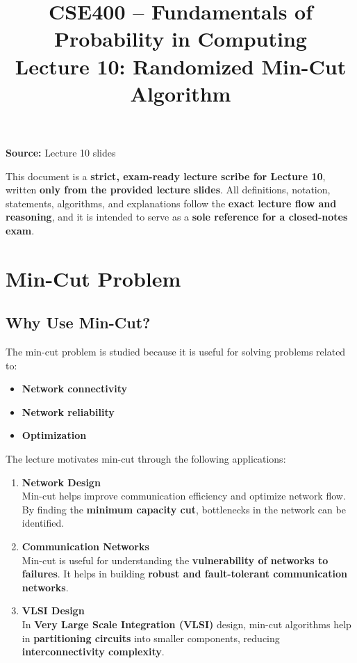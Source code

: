 \documentclass[11pt]{article}
\title{\textbf{CSE400 -- Fundamentals of Probability in Computing} \\[0.5em]
\large Lecture 10: Randomized Min-Cut Algorithm}
\author{}
\date{}
\begin{document}
\maketitle

\vspace{-1em}

\noindent
\textbf{Source:} Lecture 10 slides

\bigskip

\noindent
This document is a \textbf{strict, exam-ready lecture scribe for Lecture 10}, written \textbf{only from the provided lecture slides}.  
All definitions, notation, statements, algorithms, and explanations follow the \textbf{exact lecture flow and reasoning}, and it is intended to serve as a \textbf{sole reference for a closed-notes exam}.


\section{Min-Cut Problem}

\subsection{Why Use Min-Cut?}

The min-cut problem is studied because it is useful for solving problems related to:

\begin{itemize}
    \item \textbf{Network connectivity}
    \item \textbf{Network reliability}
    \item \textbf{Optimization}
\end{itemize}

The lecture motivates min-cut through the following applications:

\begin{enumerate}
    \item \textbf{Network Design} \\
    Min-cut helps improve communication efficiency and optimize network flow.  
    By finding the \textbf{minimum capacity cut}, bottlenecks in the network can be identified.

    \item \textbf{Communication Networks} \\
    Min-cut is useful for understanding the \textbf{vulnerability of networks to failures}.  
    It helps in building \textbf{robust and fault-tolerant communication networks}.

    \item \textbf{VLSI Design} \\
    In \textbf{Very Large Scale Integration (VLSI)} design, min-cut algorithms help in \textbf{partitioning circuits} into smaller components, reducing \textbf{interconnectivity complexity}.
\end{enumerate}
\end{document}
